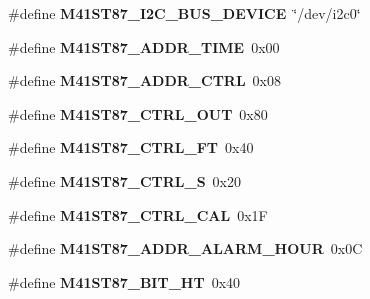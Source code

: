 \begin{DoxyCompactItemize}
\#define {\bfseries M41\+S\+T87\+\_\+\+I2\+C\+\_\+\+B\+U\+S\+\_\+\+D\+E\+V\+I\+CE}~\char`\"{}/dev/i2c0\char`\"{}
\item 
\mbox{\label{arm_2altera-cyclone-v_2rtc_2rtc_8c_a1190fa94b6b86032226ec83f10cf14a8}} 
\#define {\bfseries M41\+S\+T87\+\_\+\+A\+D\+D\+R\+\_\+\+T\+I\+ME}~0x00
\item 
\mbox{\label{arm_2altera-cyclone-v_2rtc_2rtc_8c_ab11c330fd9a73794450b548927dffac7}} 
\#define {\bfseries M41\+S\+T87\+\_\+\+A\+D\+D\+R\+\_\+\+C\+T\+RL}~0x08
\item 
\mbox{\label{arm_2altera-cyclone-v_2rtc_2rtc_8c_aa99830945a329afe52c5ac53ee02154a}} 
\#define {\bfseries M41\+S\+T87\+\_\+\+C\+T\+R\+L\+\_\+\+O\+UT}~0x80
\item 
\mbox{\label{arm_2altera-cyclone-v_2rtc_2rtc_8c_a0afa172a301634d86e3ec9327185ceaf}} 
\#define {\bfseries M41\+S\+T87\+\_\+\+C\+T\+R\+L\+\_\+\+FT}~0x40
\item 
\mbox{\label{arm_2altera-cyclone-v_2rtc_2rtc_8c_a7ffdfe4eed013081addace4d9050ed57}} 
\#define {\bfseries M41\+S\+T87\+\_\+\+C\+T\+R\+L\+\_\+S}~0x20
\item 
\mbox{\label{arm_2altera-cyclone-v_2rtc_2rtc_8c_a40eab6a893c434621c7faf238a8a5b52}} 
\#define {\bfseries M41\+S\+T87\+\_\+\+C\+T\+R\+L\+\_\+\+C\+AL}~0x1F
\item 
\mbox{\label{arm_2altera-cyclone-v_2rtc_2rtc_8c_a5883f5a9b5b4cb6a33bbd5e2978c753a}} 
\#define {\bfseries M41\+S\+T87\+\_\+\+A\+D\+D\+R\+\_\+\+A\+L\+A\+R\+M\+\_\+\+H\+O\+UR}~0x0C
\item 
\mbox{\label{arm_2altera-cyclone-v_2rtc_2rtc_8c_a7bf7413831954db32cca60fcec9c7903}} 
\#define {\bfseries M41\+S\+T87\+\_\+\+B\+I\+T\+\_\+\+HT}~0x40
\item 
\mbox{\label{arm_2altera-cyclone-v_2rtc_2rtc_8c_a962ebade5d5043f76ba37cdd1a83924d}} 

\end{DoxyCompactItemize}
